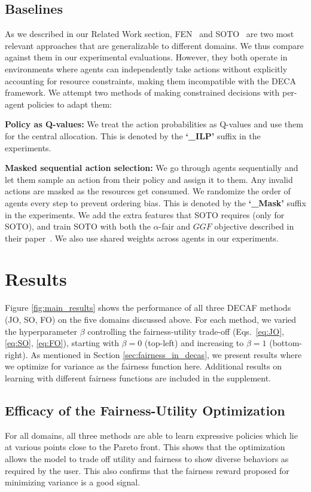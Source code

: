 \subsection{Baselines}

As we described in our Related Work section, FEN~\cite{jiang2019FEN} and SOTO~\cite{zimmer2021MOMDP} are two most relevant approaches that are generalizable to different domains. We thus compare against them in our experimental evaluations. 
However, they both operate in environments where agents can independently take actions without explicitly accounting for resource constraints, making them incompatible with the DECA framework. We attempt two methods of making constrained decisions with per-agent policies to adapt them:
\squishlist
    \item \textbf{Policy as Q-values:} We treat the action probabilities as Q-values and use them for the central allocation. This is denoted by the \textbf{`\_ILP'} suffix in the experiments.
    \item \textbf{Masked sequential action selection:} We go through agents sequentially and let them sample an action from their policy and assign it to them. Any invalid actions are masked as the resources get consumed. We randomize the order of agents every step to prevent ordering bias. This is denoted by the \textbf{`\_Mask'} suffix in the experiments.
\squishend
We add the extra features that SOTO requires (only for SOTO), and train SOTO with both the $\alpha$-fair and $GGF$ objective described in their paper~\cite{zimmer2021MOMDP}. We also use shared weights across agents in our experiments. 




\section{Results}

Figure \ref{fig:main_results} shows the performance of all three DECAF methods (JO, SO, FO) on the five domains discussed above. For each method, we varied the hyperparameter $\beta$ controlling the fairness-utility trade-off (Eqs.~\ref{eq:JO}, \ref{eq:SO}, \ref{eq:FO}), starting with $\beta=0$ (top-left) and increasing to $\beta=1$ (bottom-right).  As mentioned in Section \ref{sec:fairness_in_decas}, we present results where we optimize for variance as the fairness function here. Additional results on learning with different fairness functions are included in the supplement.

\subsection{Efficacy of the Fairness-Utility Optimization}
For all domains, all three methods are able to learn expressive policies which lie at various points close to the Pareto front. This shows that the optimization allows the model to trade off utility and fairness to show diverse behaviors as required by the user. This also confirms that the fairness reward proposed for minimizing variance is a good signal.

